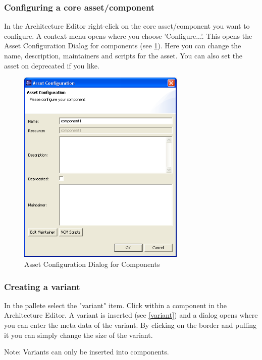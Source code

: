 \subsubsection{Configuring a core asset/component}
In the Architecture Editor right-click on the core asset/component you want to configure. 
A context menu opens where you choose 'Configure...'. This opens the Asset Configuration Dialog
for components (see \ref{configcomp}). Here you can change the name, description, maintainers and scripts for the
asset. You can also set the asset on deprecated if you like.

\begin{figure}[h!]
\begin{center}
\includegraphics[width=8cm]{configcomp.png}
   \caption{Asset Configuration Dialog for Components}
\label{configcomp}
\end{center}
\end{figure}\par

\subsubsection{Creating a variant}

In the pallete select the "variant" item. Click within a component in 
the Architecture Editor. A variant is inserted (see \ref{variant}) and a dialog opens where you can enter the meta data of
the variant. By clicking on the border and pulling it you can simply change the size of the variant. \par
Note: Variants can only be inserted into components.

